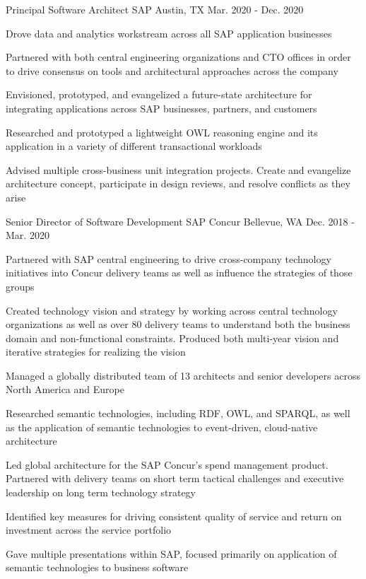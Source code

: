 \begin{cventries}

\cventry
{Principal Software Architect}
{SAP}
{Austin, TX}
{Mar. 2020 - Dec. 2020}
{
  \begin{cvitems}
  \item {Drove data and analytics workstream across all SAP application businesses}
  \item {Partnered with both central engineering organizations and CTO offices in order to drive consensus on tools and architectural approaches across the company}
  \item {Envisioned, prototyped, and evangelized a future-state architecture for integrating applications across SAP businesses, partners, and customers}
  \item {Researched and prototyped a lightweight OWL reasoning engine and its application in a variety of different transactional workloads}
  \item {Advised multiple cross-business unit integration projects. Create and evangelize architecture concept, participate in design reviews, and resolve conflicts as they arise}
  \end{cvitems}
}


\cventry
{Senior Director of Software Development}
{SAP Concur}
{Bellevue, WA}
{Dec. 2018 - Mar. 2020}
{
  \begin{cvitems}
  \item {Partnered with SAP central engineering to drive cross-company technology initiatives into Concur delivery teams as well as influence the strategies of those groups}
  \item {Created technology vision and strategy by working across central technology organizations as well as over 80 delivery teams to understand both the business domain and non-functional constraints. Produced both multi-year vision and iterative strategies for realizing the vision}
  \item {Managed a globally distributed team of 13 architects and senior developers across North America and Europe}
  \item {Researched semantic technologies, including RDF, OWL, and SPARQL, as well as the application of semantic technologies to event-driven, cloud-native architecture}
  \item {Led global architecture for the SAP Concur’s spend management product. Partnered with delivery teams on short term tactical challenges and executive leadership on long term technology strategy}
  \item {Identified key measures for driving consistent quality of service and return on investment across the service portfolio}
  \item {Gave multiple presentations within SAP, focused primarily on application of semantic technologies to business software}
  \end{cvitems}
}


\end{cventries}

